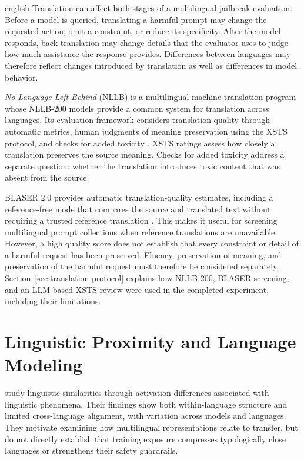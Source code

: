 \begin{otherlanguage*}{english}
Translation can affect both stages of a multilingual jailbreak evaluation. Before a model is queried, translating a harmful prompt may change the requested action, omit a constraint, or reduce its specificity. After the model responds, back-translation may change details that the evaluator uses to judge how much assistance the response provides. Differences between languages may therefore reflect changes introduced by translation as well as differences in model behavior.

\emph{No Language Left Behind} (NLLB) is a multilingual machine-translation program whose NLLB-200 models provide a common system for translation across languages. Its evaluation framework considers translation quality through automatic metrics, human judgments of meaning preservation using the XSTS protocol, and checks for added toxicity \cite{NLLBTeamScalingNeuralMachine2024,lichtConsistentHumanEvaluation2022}. XSTS ratings assess how closely a translation preserves the source meaning. Checks for added toxicity address a separate question: whether the translation introduces toxic content that was absent from the source.

BLASER 2.0 provides automatic translation-quality estimates, including a reference-free mode that compares the source and translated text without requiring a trusted reference translation \cite{daleBLASER2024}. This makes it useful for screening multilingual prompt collections when reference translations are unavailable. However, a high quality score does not establish that every constraint or detail of a harmful request has been preserved. Fluency, preservation of meaning, and preservation of the harmful request must therefore be considered separately. Section~\ref{sec:translation-protocol} explains how NLLB-200, BLASER screening, and an LLM-based XSTS review were used in the completed experiment, including their limitations.

\newpage




	\section{Linguistic Proximity and Language Modeling}

\textcite{zhou-etal-2025-linguistic} study linguistic similarities through activation differences associated with linguistic phenomena. Their findings show both within-language structure and limited cross-language alignment, with variation across models and languages. They motivate examining how multilingual representations relate to transfer, but do not directly establish that training exposure compresses typologically close languages or strengthens their safety guardrails.
	

\end{otherlanguage*}
